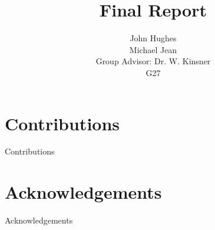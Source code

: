 \documentclass[english]{scrreprt}
\begin{document}


\subject{Design and implementation of a distributed automotive sensor/actuator network}
\title{Final Report}

\author{John Hughes\\ Michael Jean\\ Group Advisor: Dr. W. Kinsner\\ G27}

\maketitle


\begin{abstract}

\end{abstract}

\chapter*{Contributions}
Contributions

\chapter*{Acknowledgements}
Acknowledgements

\renewcommand{\contentsname}{Table of Contents}

\setcounter{tocdepth}{1}
\tableofcontents{}

\newpage
{} \label{listoffig}
\listoffigures

\newpage
{} \label{listoftab}
\listoftables

\newpage
{} \label{nomenclature}
\printnomenclature{}

\newpage







\end{document}
